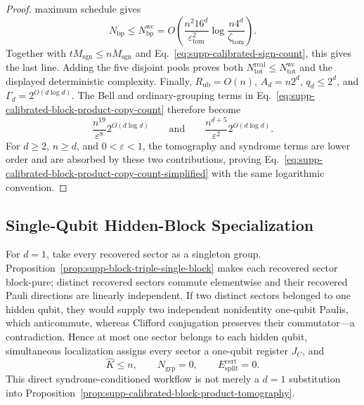 \documentclass[
  aps,
  prx,
  reprint,
  superscriptaddress,
  amsmath,
  amssymb,
  nofootinbib,
  longbibliography
]{revtex4-2}
\begin{document}
\begin{proof}
maximum schedule gives
\begin{equation}
N_{\mathrm{bp}}
\le N_{\mathrm{bp}}^{\mathrm{wc}}
=
O\!\left(
\frac{n^2 16^d}{\varepsilon_{\mathrm{tom}}^2}
\log\frac{n4^d}{\zeta_{\mathrm{tom}}}
\right).
\end{equation}
Together with \(tM_{\mathrm{sgn}}\le nM_{\mathrm{sgn}}\) and
Eq.~\eqref{eq:supp-calibrated-sign-count}, this gives the last line.
Adding the five disjoint pools proves both
\(N_{\mathrm{tot}}^{\mathrm{real}}\le N_{\mathrm{tot}}^{\mathrm{wc}}\)
and the displayed deterministic complexity.
Finally,
$R_{\mathrm{ub}}=O(n)$, $A_d=n2^d$, $q_d\le2^d$, and
$\Gamma_d=2^{O(d\log d)}$.  The Bell and ordinary-grouping terms in
Eq.~\eqref{eq:supp-calibrated-block-product-copy-count} therefore become
\begin{equation}
\frac{n^{19}}{\varepsilon^8}2^{O(d\log d)}
\qquad\text{and}\qquad
\frac{n^{d+5}}{\varepsilon^2}2^{O(d\log d)}.
\end{equation}
For $d\ge2$, $n\ge d$, and $0<\varepsilon<1$, the tomography and syndrome
terms are lower order and are absorbed by these two contributions, proving
Eq.~\eqref{eq:supp-calibrated-block-product-copy-count-simplified} with the
same logarithmic convention.
\end{proof}



\subsection{Single-Qubit Hidden-Block Specialization}
\label{sec:supp-single-qubit-hidden-block-specialization}

For \(d=1\), take every recovered sector as a singleton group.
Proposition~\ref{prop:supp-block-triple-single-block} makes each recovered
sector block-pure; distinct recovered sectors commute elementwise and their
recovered Pauli directions are linearly independent.  If two distinct sectors belonged
to one hidden qubit, they would supply two independent nonidentity one-qubit
Paulis, which anticommute, whereas Clifford conjugation preserves their
commutator---a contradiction.  Hence at most one sector belongs to each
hidden qubit, simultaneous localization assigns every sector a one-qubit
register \(J_C\), and
\[
\widehat K\le n,
\qquad
N_{\mathrm{grp}}=0,
\qquad
E_{\mathrm{split}}^{\mathrm{cert}}=0.
\]
This direct syndrome-conditioned workflow is not merely a \(d=1\)
substitution into
Proposition~\ref{prop:supp-calibrated-block-product-tomography}.
\end{document}
